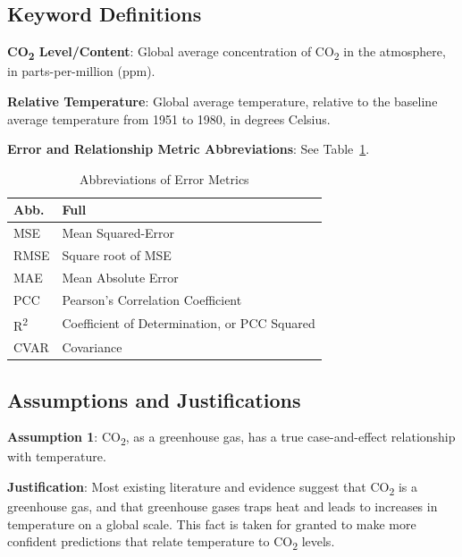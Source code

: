 \documentclass[12pt]{mcmthesis}
\begin{document}
    \subsection{Keyword Definitions}
    \noindent\textbf{CO\textsubscript{2} Level/Content}: Global average concentration of CO\textsubscript{2} in the atmosphere, in parts-per-million (ppm).

    \noindent\textbf{Relative Temperature}: Global average temperature, relative to the baseline average temperature from 1951 to 1980, in degrees Celsius.

    \noindent\textbf{Error and Relationship Metric Abbreviations}: See Table~\ref{tab:err_abb}.

    \begin{table}[H]
        \centering
        \begin{tabular}{ll}
            \toprule
            Abb.                 & Full                                         \\
            \midrule
            MSE                  & Mean Squared-Error                           \\
            RMSE                 & Square root of MSE                           \\
            MAE                  & Mean Absolute Error                          \\
            PCC                  & Pearson's Correlation Coefficient            \\
            R\textsuperscript{2} & Coefficient of Determination, or PCC Squared \\
            CVAR                 & Covariance                                   \\
            \bottomrule
        \end{tabular}
        \vspace{8pt}
        \caption{Abbreviations of Error Metrics}
        \label{tab:err_abb}
    \end{table}

    \subsection{Assumptions and Justifications}
    \noindent\textbf{Assumption 1}: CO\textsubscript{2}, as a greenhouse gas, has a true case-and-effect relationship with temperature.

    \vspace{-6pt}
    \noindent\textbf{Justification}: Most existing literature and evidence suggest that CO\textsubscript{2} is a greenhouse gas, and that greenhouse gases traps heat and leads to increases in temperature on a global scale. This fact is taken for granted to make more confident predictions that relate temperature to CO\textsubscript{2} levels.
\end{document}

